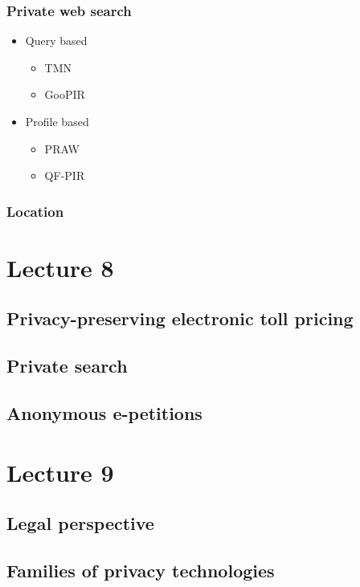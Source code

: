 \documentclass[a4paper,12pt,english]{article}
\begin{document}
\subsubsection{Private web search}
\begin{itemize}
	\item Query based
	\begin{itemize}
		\item TMN
		\item GooPIR
	\end{itemize}
	\item Profile based
	\begin{itemize}
		\item PRAW
		\item QF-PIR
	\end{itemize}
\end{itemize}
\subsubsection{Location}

\section{Lecture 8}
\subsection{Privacy-preserving electronic toll pricing}

\subsection{Private search}

\subsection{Anonymous e-petitions}

\section{Lecture 9}
\subsection{Legal perspective}

\subsection{Families of privacy technologies}
\end{document}
